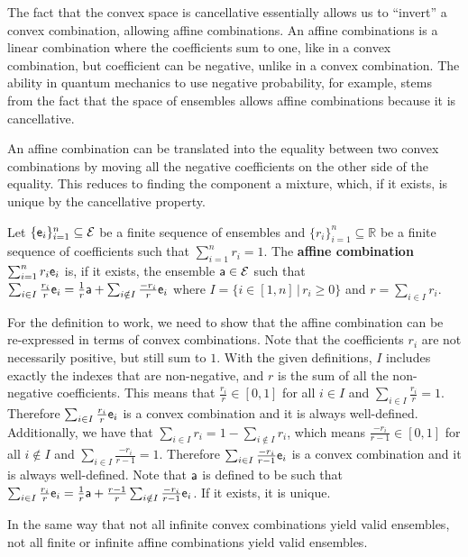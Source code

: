 The fact that the convex space is cancellative essentially allows us to ``invert'' a convex combination, allowing affine combinations. An affine combinations is a linear combination where the coefficients sum to one, like in a convex combination, but coefficient can be negative, unlike in a convex combination. The ability in quantum mechanics to use negative probability, for example, stems from the fact that the space of ensembles allows affine combinations because it is cancellative.

An affine combination can be translated into the equality between two convex combinations by moving all the negative coefficients on the other side of the equality. This reduces to finding the component a mixture, which, if it exists, is unique by the cancellative property.

\begin{mathSection}	
\begin{defn}
	Let $\{\ens_i\}_{i=1}^n \subseteq \Ens$ be a finite sequence of ensembles and $\{r_i\}_{i=1}^n \subseteq \mathbb{R}$ be a finite sequence of coefficients such that $\sum_{i=1}^n r_i = 1$. The \textbf{affine combination} $\sum_{i=1}^n r_i \ens_i$ is, if it exists, the ensemble $\ens[a] \in \Ens$ such that  $\sum_{i \in I} \frac{r_i}{r} \ens_i = \frac{1}{r} \ens[a] + \sum_{i \notin I} \frac{-r_i}{r} \ens_i$ where $I = \{ i \in [1,n] \, | \, r_i \geq 0 \}$ and $r = \sum_{i \in I} r_i$.
\end{defn}

\begin{check}
	For the definition to work, we need to show that the affine combination can be re-expressed in terms of convex combinations. Note that the coefficients $r_i$ are not necessarily positive, but still sum to $1$. With the given definitions, $I$ includes exactly the indexes that are non-negative, and $r$ is the sum of all the non-negative coefficients. This means that $\frac{r_i}{r} \in [0,1]$ for all $i \in I$ and $\sum_{i \in I} \frac{r_i}{r}=1$. Therefore $\sum_{i \in I} \frac{r_i}{r} \ens_i$ is a convex combination and it is always well-defined. Additionally, we have that $\sum_{i \in I} r_i = 1 - \sum_{i \notin I} r_i$, which means $\frac{-r_i}{r - 1} \in [0,1]$ for all $i \notin I$ and $\sum_{i \in I} \frac{-r_i}{r-1}=1$. Therefore $\sum_{i \in I} \frac{-r_i}{r-1} \ens_i$ is a convex combination and it is always well-defined. Note that $\ens[a]$ is defined to be such that $\sum_{i \in I} \frac{r_i}{r} \ens_i = \frac{1}{r} \ens[a] + \frac{r-1}{r}\sum_{i \notin I} \frac{-r_i}{r-1} \ens_i$. If it exists, it is unique.
\end{check}	

\begin{remark}
	In the same way that not all infinite convex combinations yield valid ensembles, not all finite or infinite affine combinations yield valid ensembles.
\end{remark}
\end{mathSection}

